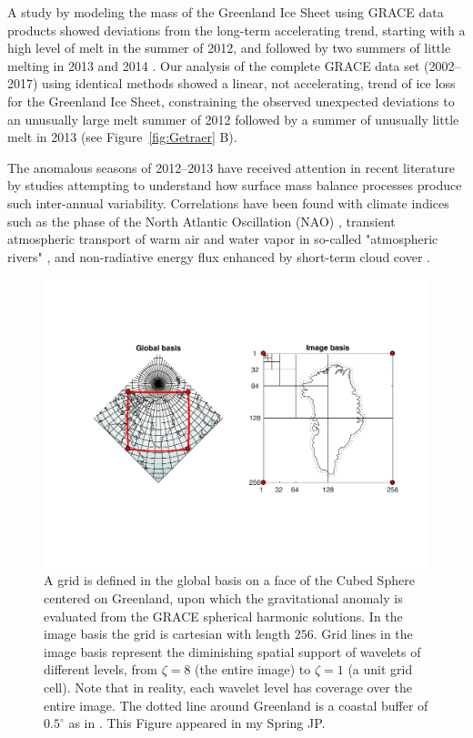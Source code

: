 \documentclass[11pt]{report}
\begin{document}
A study by \cite{Harig+2016} modeling the mass of the Greenland Ice Sheet
using GRACE data products showed deviations from the long-term accelerating
trend, starting with a high level of melt in the summer of 2012, and followed by two
summers of little melting in 2013 and 2014 \cite[see
Figure~\ref{fig:Getraer} A, comparable to][their
Figure~4]{Harig+2016}. Our analysis of the complete GRACE data set (2002--2017) using identical methods showed a linear,
not accelerating, trend of ice loss for the Greenland Ice Sheet, constraining the observed unexpected deviations to an unusually large melt summer of 2012 followed by a summer of unusually little melt in 2013 (see
Figure~\ref{fig:Getraer} B). 


The anomalous seasons of 2012--2013 have received attention in recent literature by studies attempting to understand how surface mass balance processes produce such inter-annual variability. Correlations have been found with climate indices such as the phase of the North Atlantic Oscillation (NAO) \cite[][]{mcmillan2016,bevis2018,getraerFall}, transient atmospheric transport of warm air and water vapor in so-called "atmospheric rivers" \citep{mattingly2018}, and non-radiative energy flux enhanced by short-term cloud cover \citep{solomon2017}. 

\begin{figure} 
\includegraphics[width=1.1\linewidth]{Figures/thegrid.pdf}
\caption[The Discrete Grid Around Greenland]{A grid is defined in the global basis on a face of the Cubed Sphere centered on Greenland, upon which the gravitational anomaly is evaluated from the GRACE spherical harmonic solutions. In the image basis the grid is cartesian with length $256$. Grid lines in the image basis represent the diminishing spatial support of wavelets of different levels, from $\zeta=8$ (the entire image) to $\zeta=1$ (a unit grid cell). Note that in reality, each wavelet level has coverage over the entire image. The dotted line around Greenland is a coastal buffer of $0.5^{\circ}$ as in \cite{Harig+2016}. This Figure appeared in my Spring JP.} \label{fig:thegrid}
\end{figure}
\end{document}
